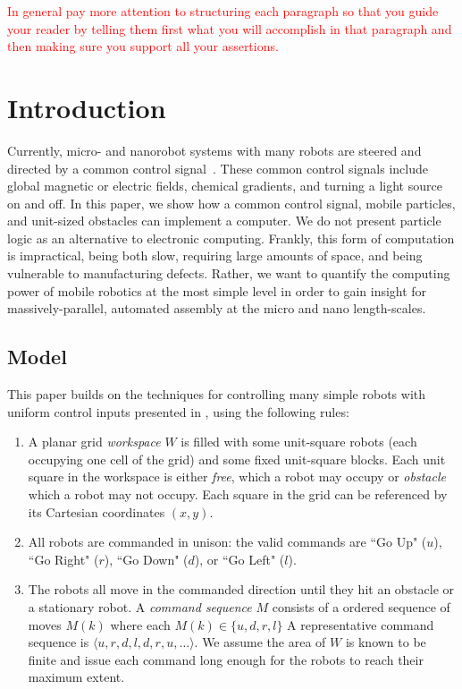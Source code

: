\documentclass[letterpaper, 10 pt, conference]{ieeeconf}
\begin{document}
\textcolor{red}{In general pay more attention to structuring each paragraph so that you guide your reader by telling them first what you will accomplish in that paragraph and then making sure you support all your assertions.}

\section{Introduction}
    
  Currently, micro- and nanorobot systems with many robots are steered and directed by a common control signal~\cite{Donald2013,Chiang2011,Hsi-Wen2012,Diller2013,Jing2013,Ou2013,Lanauze2013}. These common control signals include global magnetic or electric fields, chemical gradients, and turning a light source on and off.  In this paper, we show how a common control signal, mobile particles, and unit-sized obstacles can implement a computer.  
    We do not present particle logic as an alternative to electronic computing.
  Frankly, this form of computation is impractical, being both slow, requiring large amounts of space, and being vulnerable to manufacturing defects. Rather, we want to quantify the computing power of mobile robotics at the most simple level in order to gain insight for massively-parallel, automated assembly at the micro and nano length-scales.
  
  \subsection{Model}
  
  This paper builds on the techniques for controlling many simple robots with uniform control inputs presented in \cite{Becker2013f,Becker2014,Becker2014a}, using the following rules:
\begin{enumerate}
\item A planar  grid \emph{workspace} $W$ is filled with some unit-square robots (each occupying one cell of the grid)  and some fixed unit-square blocks.  Each unit square in the workspace is either  \emph{free}, which a robot may occupy or \emph{obstacle} which a robot may not occupy.  Each square in the grid can be referenced by its Cartesian coordinates $(x,y)$.
\item All robots are commanded in unison: the valid commands are  ``Go Up" ($u$), ``Go Right" ($r$), ``Go Down" ($d$), or ``Go Left" ($l$).  
\item The robots all move in the commanded direction until they hit an obstacle or a stationary robot. A \emph{command sequence} $M$ consists of a ordered sequence of moves $M(k)$ where each $M(k)\in\{u,d,r,l\}$  A representative command sequence is $\langle u,r,d,l,d,r,u,\ldots\rangle$. We assume the area of $W$ is known to be finite and issue each command long enough for the robots to reach their maximum extent.
\end{enumerate}
  
\end{document}
